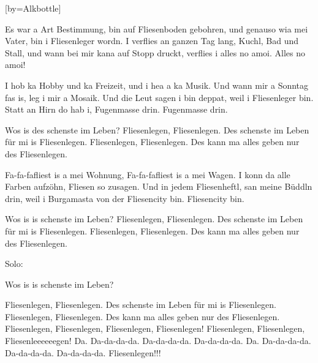 [by={Alkbottle}]


\chordson




\beginverse

Es war a Art Bestimmung, bin auf Fliesenboden gebohren,
und genauso wia mei Vater, bin i Fliesenleger wordn.
I verflies an ganzen Tag lang, Kuchl, Bad und Stall,
und wann bei mir kana auf Stopp druckt, verflies i alles no amoi.
Alles no amoi!

\endverse

\beginverse

I hob ka Hobby und ka Freizeit, und i hea a ka Musik.
Und wann mir a Sonntag fas is, leg i mir a Mosaik.
Und die Leut sagen i bin deppat, weil i Fliesenleger bin.
Statt an Hirn do hab i, Fugenmasse drin. Fugenmasse drin.

\endverse


\beginchorus
Wos is des schenste im Leben?
Fliesenlegen, Fliesenlegen. Des schenste im Leben für mi is Fliesenlegen.
Fliesenlegen, Fliesenlegen. Des kann ma alles geben nur des Fliesenlegen.
\endchorus

\beginverse
Fa-fa-fafliest is a mei Wohnung, Fa-fa-fafliest is a mei Wagen.
I konn da alle Farben aufzöhn, Fliesen so zusagen.
Und in jedem Fliesenheftl, san meine Büddln drin,
weil i Burgamasta von der Fliesencity bin. Fliesencity bin.
\endverse

\beginchorus
Wos is is schenste im Leben?
Fliesenlegen, Fliesenlegen. Des schenste im Leben für mi is Fliesenlegen.
Fliesenlegen, Fliesenlegen. Des kann ma alles geben nur des Fliesenlegen.
\endchorus

\beginverse
Solo:
\endverse

\beginverse
Wos is is schenste im Leben?
\endverse

\beginchorus
Fliesenlegen, Fliesenlegen. Des schenste im Leben für mi is Fliesenlegen.
Fliesenlegen, Fliesenlegen. Des kann ma alles geben nur des Fliesenlegen.
Fliesenlegen, Fliesenlegen, Fliesenlegen, Fliesenlegen!
Fliesenlegen, Fliesenlegen, Fliesenleeeeeegen!
Da. Da-da-da-da. Da-da-da-da. Da-da-da-da.
Da. Da-da-da-da. Da-da-da-da. Da-da-da-da.
Fliesenlegen!!!
\endchorus

\endsong
